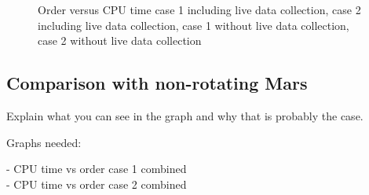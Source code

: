 \begin{figure}
\caption{Order versus CPU time \protect{} case 1 including live data collection, \protect{} case 2 including live data collection, \protect{} case 1 without live data collection, \protect{} case 2 without live data collection } 
\label{fig:orderVsCPUcase1IncludingLiveDataCollection} 
\end{figure} 



\subsection{Comparison with non-rotating Mars}
\label{subsec:orderCompNotRot}

Explain what you can see in the graph and why that is probably the case.

Graphs needed:

- CPU time vs order case 1 combined \\
- CPU time vs order case 2 combined \\


